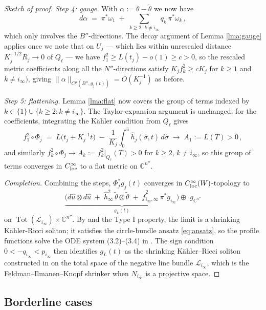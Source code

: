 \documentclass[11pt]{amsart}
\theoremstyle{plain}
\numberwithin{equation}{section}
\theoremstyle{definition}
\theoremstyle{remark}
\begin{document}
\begin{proof}[Sketch of proof]
\emph{Step 4: gauge.} With $\alpha := \theta - \widetilde{\theta}$ we now have
\[d\alpha \;=\; \pi^*\omega_1 \;+\; \sum_{k \geq 2, \, k \neq i_\infty} q_k \, \pi^*\omega_k\,,\]
which only involves the $B''$-directions. The decay argument of Lemma \ref{lma:gauge} applies once we note that on $U_j$ --- which lies within unrescaled distance $K_j^{-1/2}R_j \to 0$ of $Q_\ell$ --- we have $f_1^2 \geq L(t_j) - o(1) \geq c > 0$, so the rescaled metric coefficients along all the $N''$-directions satisfy $K_jf_k^2 \geq cK_j$ for $k \geq 1$ and $k \not= i_\infty)$, giving $\|\alpha\|_{C^\mu(B'', g_j(t))} = O(K_j^{-1})$ as before.

\emph{Step 5: flattening.} Lemma \ref{lma:flat} now covers the group of terms indexed by $k \in \{1\} \cup \{k \geq 2 : k \neq i_\infty\}$. The Taylor-expansion argument is unchanged; for the coefficients, integrating the K\"ahler condition from $Q_\ell$ gives
\[f_1^2 \circ \Phi_j \;=\; L\big(t_j + K_j^{-1}t\big) \;-\; \frac{1}{K_j}\int_0^{\hat{u}}\hat{h}_j(\hat\sigma,t)\,d\hat\sigma \;\longrightarrow\; A_1 := L(T) > 0\,,\]
and similarly $f_k^2 \circ \Phi_j \to A_k := f_k^2\big|_{Q_\ell}(T) > 0$ for $k \geq 2$, $k \neq i_\infty$, so this group of terms converges in $C^\infty_{\textup{loc}}$ to a flat metric on $\mathbb{C}^{n''}$.

\emph{Completion.} Combining the steps, $\Phi_j^*g_j(t)$ converges in $C^\infty_{\textup{loc}}(W)$-topology to
\[\underbrace{\Big(d\hat{u}\otimes d\hat{u} \;+\; \hat{h}_\infty^2\,\widetilde{\theta}\otimes\widetilde{\theta} \;+\; \hat{f}_{i_\infty,\infty}^2\,\pi^*g_{i_\infty}\Big)}_{g_L(t)} \oplus \; g_{\mathbb{C}^{n''}}\]
on $\operatorname{Tot}(\mathcal{L}_{i_\infty}) \times \mathbb{C}^{n''}$. By \cite{EMT, Naber} and the Type I property, the limit is a shrinking K\"ahler-Ricci soliton; it satisfies the circle-bundle ansatz \eqref{eq:ansatz}, so the profile functions solve the ODE system (3.2)--(3.4) in \cite{DW2011}. The sign condition $0 < -q_{i_\infty} < p_{i_\infty}$ then identifies $g_L(t)$ as the shrinking K\"ahler--Ricci soliton constructed in \cite[Theorem 3.36]{DW2011} on the total space of the negative line bundle $\mathcal{L}_{i_\infty}$, which is the Feldman--Ilmanen--Knopf shrinker \cite{FIK} when $N_{i_\infty}$ is a projective space.
\end{proof}

\subsection{Borderline cases}
\end{document}
